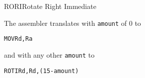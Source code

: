 \begin{instruction}{RORI}{Rotate Right Immediate}
  \begin{remarks}
The assembler translates \texttt{\mnemonic} with \texttt{amount} of 0 to
\begin{alltt}
  MOV  Rd, Ra
\end{alltt}
and \texttt{\mnemonic} with any other \texttt{amount} to
\begin{alltt}
  ROTI Rd, Rd, (15 - amount)
\end{alltt}
  \end{remarks}
\end{instruction}

